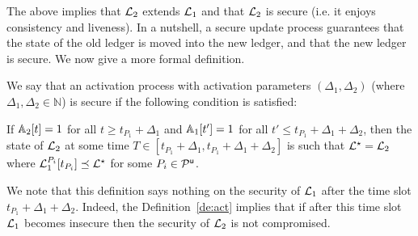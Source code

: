 




The above implies that $\mathcal{L}_2$ extends $\mathcal{L}_1$ and that $\mathcal{L}_2$ is secure (i.e. it enjoys consistency and liveness).
In a nutshell, a secure update process guarantees that the state of the old ledger is moved into the new ledger, and that the new ledger is secure.
We now give a more formal definition.

\begin{definition}\label{de:act}
 We say that an activation process with activation parameters $(\Delta_1,\Delta_2)$ (where $\Delta_1,\Delta_2\in\mathbb{N}$) is secure if the following condition is satisfied:

If $\mathbb{A}_2[t]=1$ for all $t\geq t_{P_1}+\Delta_1$ %
and $\mathbb{A}_1[t']=1$ for all $t' \leq t_{P_1}+\Delta_1+\Delta_2$, then the state of $\mathcal{L}_2$ at some time $T\in [t_{P_1}+\Delta_1, t_{P_1}+\Delta_1+\Delta_2]$ is such that $\mathcal{L}^\star=\mathcal{L}_2$ where $  \mathcal{L}_1^{P_i}[t_{P_i}] \preceq \mathcal{L}^\star$ for some $P_i\in\mathcal{P}^\mathsf{u}$.  

\end{definition}

We note that this definition says nothing on the security of $\mathcal{L}_1$ after the time slot $t_{P_1}+\Delta_1+\Delta_2$. Indeed, the Definition~\ref{de:act} implies that if
after this time slot $\mathcal{L}_1$ becomes insecure then the security of $\mathcal{L}_2$ is not compromised.



